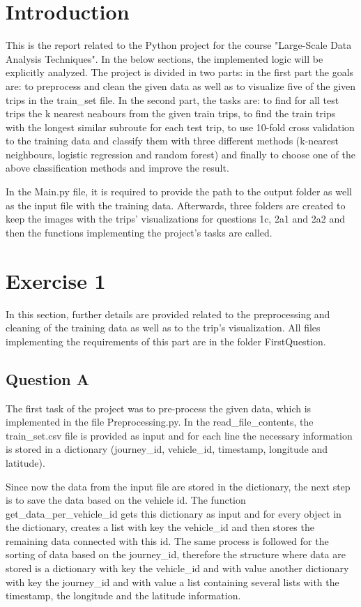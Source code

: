 \documentclass[12pt]{article}
\begin{document}
	\section{Introduction}
    This is the report related to the Python project for the course "Large-Scale Data Analysis Techniques". In the below sections, the implemented logic will be explicitly analyzed. The project is divided in two parts: in the first part the goals are: to preprocess and clean the given data as well as to visualize five of the given trips in the train\_set file. In the second part, the tasks are: to find for all test trips the k nearest neabours from the given train trips, to find the train trips with the longest similar subroute for each test trip, to use 10-fold cross validation to the training data and classify them with three different methods (k-nearest neighbours, logistic regression and random forest) and finally to choose one of the above classification methods and improve the result.
    
    In the Main.py file, it is required to provide the path to the output folder as well as the input file with the training data. Afterwards, three folders are created to keep the images with the trips' visualizations for questions 1c, 2a1 and 2a2 and then the functions implementing the project's tasks are called.
    
	\section{Exercise 1}
	In this section, further details are provided related to the preprocessing and cleaning of the training data as well as to the trip's visualization. All files implementing the requirements of this part are in the folder FirstQuestion.
	
	\subsection{Question A}
	The first task of the project was to pre-process the given data, which is implemented in the file Preprocessing.py. In the read\_file\_contents, the train\_set.csv file is provided as input and for each line the necessary information is stored in a dictionary (journey\_id, vehicle\_id, timestamp, longitude and latitude).
	
	Since now the data from the input file are stored in the dictionary, the next step is to save the data based on the vehicle id. The function get\_data\_per\_vehicle\_id gets this dictionary as input and for every object in the dictionary, creates a list with key the vehicle\_id and then stores the remaining data connected with this id. The same process is followed for the sorting of data based on the journey\_id, therefore the structure where data are stored is a dictionary with key the vehicle\_id and with value another dictionary with key the journey\_id and with value a list containing several lists with the timestamp, the longitude and the latitude information.
	
\end{document}
